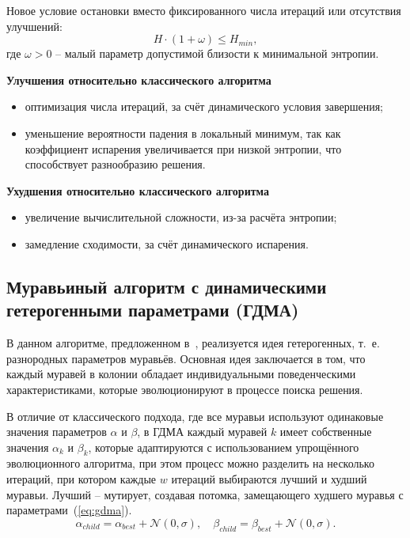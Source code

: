 Новое условие остановки вместо фиксированного числа итераций или отсутствия улучшений:
\begin{equation}
    H \cdot (1 + \omega) \leqslant H_{min},
	\label{eq:maefin}
\end{equation}
где $\omega > 0$ -- малый параметр допустимой близости к минимальной энтропии.

\textbf{Улучшения относительно классического алгоритма}

\begin{itemize}
	\item оптимизация числа итераций, за счёт динамического условия завершения;
	\item уменьшение вероятности падения в локальный минимум, так как коэффициент испарения увеличивается при низкой энтропии, что способствует разнообразию решения.
\end{itemize}

\textbf{Ухудшения относительно классического алгоритма}

\begin{itemize}
	\item увеличение вычислительной сложности, из-за расчёта энтропии;
	\item замедление сходимости, за счёт динамического испарения.
\end{itemize}

\subsection*{Муравьиный алгоритм с динамическими гетерогенными параметрами (ГДМА)}

В данном алгоритме, предложенном в~\cite{hetero}, реализуется идея гетерогенных, т.~е. разнородных параметров муравьёв. Основная идея заключается в том, что каждый муравей в колонии обладает индивидуальными поведенческими характеристиками, которые эволюционируют в процессе поиска решения.

В отличие от классического подхода, где все муравьи используют одинаковые значения параметров $\alpha$ и $\beta$, в ГДМА каждый муравей $k$ имеет собственные значения $\alpha_k$ и $\beta_k$, которые адаптируются с использованием упрощённого эволюционного алгоритма, при этом процесс можно разделить на несколько итераций, при котором каждые $w$ итераций выбираются лучший и худший муравьи. Лучший -- мутирует, создавая потомка, замещающего худшего муравья с параметрами~(\ref{eq:gdma}).
\begin{equation}
\alpha_{child} = \alpha_{best} + \mathcal{N}(0, \sigma), \quad \beta_{child} = \beta_{best} + \mathcal{N}(0, \sigma).
\label{eq:gdma}
\end{equation}


